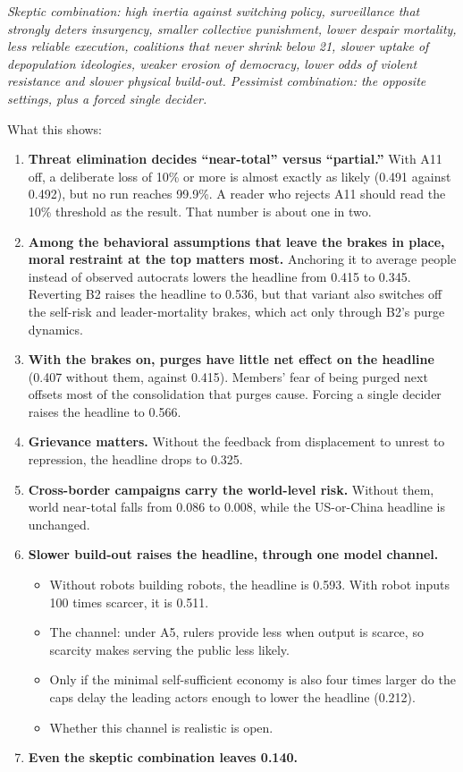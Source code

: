 \documentclass[
  10pt,
]{article}
\providecommand{\tightlist}{%
  \setlength{\itemsep}{0pt}\setlength{\parskip}{0pt}}
\begin{document}
\emph{Skeptic combination: high inertia against switching policy, surveillance that strongly deters
insurgency, smaller collective punishment, lower despair mortality, less reliable execution,
coalitions that never shrink below 21, slower uptake of depopulation ideologies, weaker erosion of
democracy, lower odds of violent resistance and slower physical build-out. Pessimist combination:
the opposite settings, plus a forced single decider.}

What this shows:

\begin{enumerate}
\def\labelenumi{\arabic{enumi}.}
\tightlist
\item
  \textbf{Threat elimination decides ``near-total'' versus ``partial.''} With A11 off, a deliberate
  loss of 10\% or more is almost exactly as likely (0.491 against 0.492), but no run reaches 99.9\%.
  A reader who rejects A11 should read the 10\% threshold as the result. That number is about one in
  two.
\item
  \textbf{Among the behavioral assumptions that leave the brakes in place, moral restraint at the
  top matters most.} Anchoring it to average people instead of observed autocrats lowers the
  headline from 0.415 to 0.345. Reverting B2 raises the headline to 0.536, but that variant also
  switches off the self-risk and leader-mortality brakes, which act only through B2's purge
  dynamics.
\item
  \textbf{With the brakes on, purges have little net effect on the headline} (0.407 without them,
  against 0.415). Members' fear of being purged next offsets most of the consolidation that purges
  cause. Forcing a single decider raises the headline to 0.566.
\item
  \textbf{Grievance matters.} Without the feedback from displacement to unrest to repression, the
  headline drops to 0.325.
\item
  \textbf{Cross-border campaigns carry the world-level risk.} Without them, world near-total falls
  from 0.086 to 0.008, while the US-or-China headline is unchanged.
\item
  \textbf{Slower build-out raises the headline, through one model channel.}

  \begin{itemize}
  \tightlist
  \item
    Without robots building robots, the headline is 0.593. With robot inputs 100 times scarcer, it
    is 0.511.
  \item
    The channel: under A5, rulers provide less when output is scarce, so scarcity makes serving the
    public less likely.
  \item
    Only if the minimal self-sufficient economy is also four times larger do the caps delay the
    leading actors enough to lower the headline (0.212).
  \item
    Whether this channel is realistic is open.
  \end{itemize}
\item
  \textbf{Even the skeptic combination leaves 0.140.}
\end{enumerate}
\end{document}
